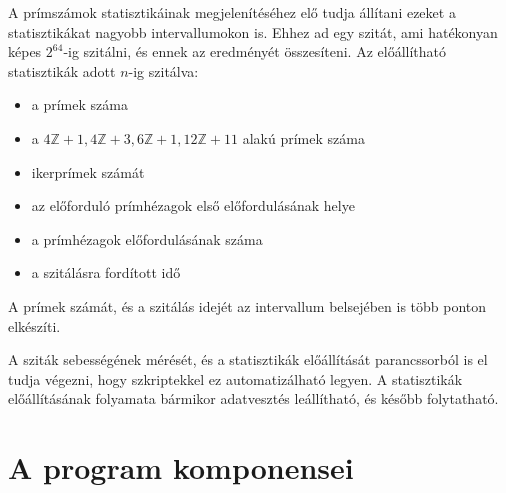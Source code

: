 A prímszámok statisztikáinak megjelenítéséhez
elő tudja állítani ezeket a statisztikákat nagyobb intervallumokon is.
Ehhez ad egy szitát, ami hatékonyan képes $2^{64}$-ig szitálni,
és ennek az eredményét összesíteni. Az előállítható statisztikák
adott $n$-ig szitálva:
\begin{itemize}
\item a prímek száma
\item a $4\mathbb{Z}+1, 4\mathbb{Z}+3, 6\mathbb{Z}+1, 12\mathbb{Z}+11$
	alakú prímek száma
\item ikerprímek számát
\item az előforduló prímhézagok első előfordulásának helye
\item a prímhézagok előfordulásának száma
\item a szitálásra fordított idő
\end{itemize}

A prímek számát, és a szitálás idejét az intervallum belsejében is több ponton elkészíti.

A sziták sebességének mérését, és a statisztikák előállítását
parancssorból is el tudja végezni, hogy szkriptekkel ez automatizálható legyen.
A statisztikák előállításának folyamata
bármikor adatvesztés leállítható, és később folytatható.


\pagebreak
\section{A program komponensei}

